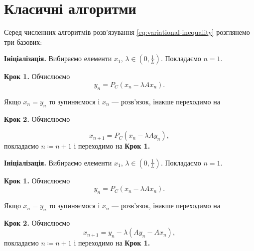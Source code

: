 \section{Класичні алгоритми}

Серед численних алгоритмів розв'язування \eqref{eq:variational-inequality} розглянемо три базових:

\begin{algorithm}[Корпелевич]
    \label{algo:korpelevich}
    \textbf{Ініціалізація.} Вибираємо елементи $x_1$, $\lambda \in \left( 0, \frac{1}{L} \right)$. Покладаємо $n = 1$. \medskip

    \textbf{Крок 1.} Обчислюємо
    \begin{equation}
        y_n = P_C (x_n - \lambda A x_n).
    \end{equation}
    
    Якщо $x_n = y_n$ то зупиняємося і $x_n$ --- розв'язок, інакше переходимо на \medskip
    
    \textbf{Крок 2.} Обчислюємо
    
    
    \begin{equation}
        x_{n + 1} = P_C (x_n - \lambda A y_n),
    \end{equation}
    покладаємо $n \coloneqq n + 1$ і переходимо на \textbf{Крок 1.}
\end{algorithm}

\begin{algorithm}[P. Tseng]
    \label{algo:tseng}
    \textbf{Ініціалізація.} Вибираємо елементи $x_1$, $\lambda \in \left( 0, \frac{1}{L} \right)$. Покладаємо $n = 1$. \medskip

    \textbf{Крок 1.} Обчислюємо
    \begin{equation}
        y_n = P_C (x_n - \lambda A x_n).
    \end{equation}
    
    Якщо $x_n = y_n$ то зупиняємося і $x_n$ --- розв'язок, інакше переходимо на \medskip
    
    \textbf{Крок 2.} Обчислюємо
    \begin{equation}
        x_{n + 1} = y_n - \lambda (A y_n - A x_n),
    \end{equation}
    покладаємо $n \coloneqq n + 1$ і переходимо на \textbf{Крок 1.}
\end{algorithm}

